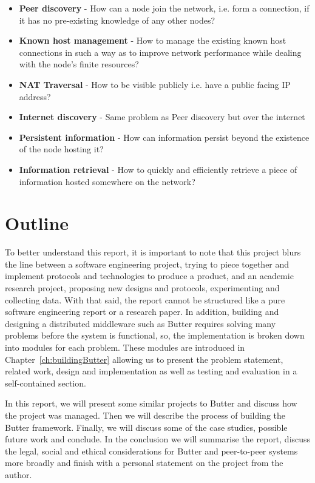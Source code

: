 \begin{itemize}
    \item \textbf{Peer discovery} - How can a node join the network, i.e. form a connection, if it has no pre-existing knowledge of any other nodes?
    \item \textbf{Known host management} - How to manage the existing known host connections in such a way as to improve network performance while dealing with the node's finite resources?
    \item \textbf{NAT Traversal} - How to be visible publicly i.e. have a public facing IP address?
    \item \textbf{Internet discovery} - Same problem as Peer discovery but over the internet
    \item \textbf{Persistent information} - How can information persist beyond the existence of the node hosting it?
    \item \textbf{Information retrieval} - How to quickly and efficiently retrieve a piece of information hosted somewhere on the network?
\end{itemize}


\section{Outline}
\label{sec:outline}
To better understand this report, it is important to note that this project blurs the line between a software engineering project, trying to piece together and implement protocols and technologies to produce a product, and an academic research project, proposing new designs and protocols, experimenting and collecting data. With that said, the report cannot be structured like a pure software engineering report or a research paper. In addition, building and designing a distributed middleware such as Butter requires solving many problems before the system is functional, so, the implementation is broken down into modules for each problem. These modules are introduced in Chapter~\ref{ch:buildingButter} allowing us to present the problem statement, related work, design and implementation as well as testing and evaluation in a self-contained section.

In this report, we will present some similar projects to Butter and discuss how the project was managed. Then we will describe the process of building the Butter framework. Finally, we will discuss some of the case studies, possible future work and conclude. In the conclusion we will summarise the report, discuss the legal, social and ethical considerations for Butter and peer-to-peer systems more broadly and finish with a personal statement on the project from the author.


